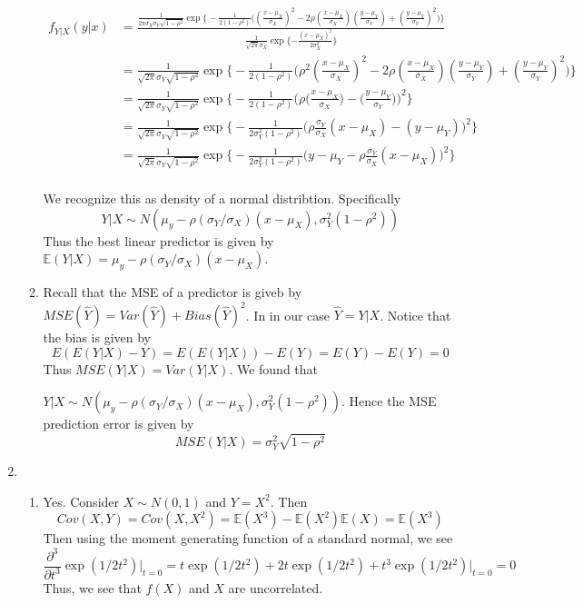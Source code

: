 \documentclass[12pt]{article}  %
\newcommand{\E}{{\mathbb{E}}}
\begin{document}
\begin{enumerate}
\begin{enumerate}
 \begin{align*}
 f_{Y|X}(y|x) &= \frac{\frac{1}{2\pi\sigma_X\sigma_Y\sqrt{1-\rho^2}}\exp\Big\{-\frac{1}{2(1-\rho^2)}\Big((\frac{x-\mu_X}{\sigma_X})^2-2\rho(\frac{x-\mu_X}{\sigma_X})(\frac{y-\mu_Y}{\sigma_Y}) + (\frac{y-\mu_Y}{\sigma_Y})^2\Big)\Big\}}{\frac{1}{\sqrt{2\pi}\sigma_X}\exp\{-\frac{(x-\mu_X)^2}{2\sigma_X^2}\}}\\
 &= \frac{1}{\sqrt{2\pi}\sigma_Y\sqrt{1-\rho^2}}\exp\Big\{-\frac{1}{2(1-\rho^2)}\Big(\rho^2(\frac{x-\mu_X}{\sigma_X})^2-2\rho(\frac{x-\mu_X}{\sigma_X})(\frac{y-\mu_Y}{\sigma_Y}) + (\frac{y-\mu_Y}{\sigma_Y})^2\Big)\Big\}\\
 &=\frac{1}{\sqrt{2\pi}\sigma_Y\sqrt{1-\rho^2}}\exp\Big\{-\frac{1}{2(1-\rho^2)}\Big(\rho\big(\frac{x-\mu_X}{\sigma_X}\big) -\big(\frac{y-\mu_Y}{\sigma_Y}\big)\Big)^2\Big\}\\
 &= \frac{1}{\sqrt{2\pi}\sigma_Y\sqrt{1-\rho^2}}\exp\Big\{-\frac{1}{2\sigma_Y^2(1-\rho^2)}\Big(\rho\frac{\sigma_Y}{\sigma_X}(x-\mu_X) - (y-\mu_Y)\Big)^2\Big\}\\
&= \frac{1}{\sqrt{2\pi}\sigma_Y\sqrt{1-\rho^2}}\exp\Big\{-\frac{1}{2\sigma_Y^2(1-\rho^2)}\Big(y-\mu_Y - \rho\frac{\sigma_Y}{\sigma_X}(x-\mu_X)\Big)^2\Big\}\\
\end{align*}

We recognize this as density of a normal distribtion. Specifically $$Y|X \sim N\left(\mu_y-\rho(\sigma_Y/\sigma_X)(x-\mu_X), \sigma_Y^2(1-\rho^2)\right)$$ Thus the best linear predictor is given by $\E(Y|X) = \mu_y-\rho(\sigma_Y/\sigma_X)(x-\mu_X)$. 

\item Recall that the MSE of a predictor is giveb by $MSE(\hat{Y}) = Var(\hat{Y}) + Bias(\hat{Y})^2$. In in our case $\hat{Y} = Y|X$. Notice that the bias is given by $$E(E(Y|X) - Y ) = E(E(Y|X)) - E(Y) = E(Y) - E(Y) = 0$$Thus $MSE(Y|X) = Var(Y|X)$. We found that 

$Y|X \sim N\left(\mu_y-\rho(\sigma_Y/\sigma_X)(x-\mu_X), \sigma_Y^2(1-\rho^2)\right)$. Hence the MSE prediction error is given by $$MSE(Y|X) = \sigma_Y^2\sqrt{1-\rho^2}$$

\end{enumerate}

\item 
\begin{enumerate}

\item Yes. Consider $X\sim N(0,1)$ and $Y = X^2$. Then $$Cov(X,Y) = Cov(X,X^2) = \E(X^3) - \E(X^2)\E(X) = \E(X^3)$$ Then using the moment generating function of a standard normal, we see $$\frac{\partial^3}{\partial t^3}\exp(1/2t^2)\Big\vert_{t=0} = t\exp(1/2t^2) + 2t\exp(1/2t^2) + t^3\exp(1/2t^2)\Big\vert_{t=0} = 0$$ Thus, we see that $f(X)$ and $X$ are uncorrelated.


\end{enumerate}
\end{enumerate}
\end{document}

